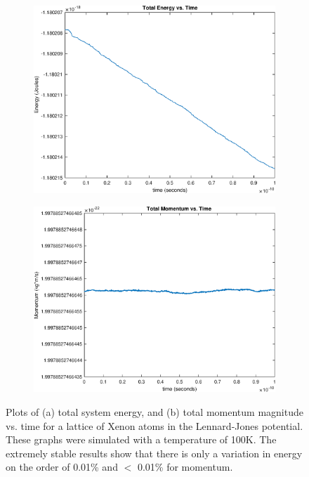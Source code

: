 \documentclass[12pt]{article}
\begin{document}
\begin{figure}[!h]
\begin{subfigure}{0.5\textwidth}
\includegraphics[width=0.9\linewidth]{./finalpics/LJEvsT.eps}
\caption{\label{LJEconservation}}
\end{subfigure}
\begin{subfigure}{0.5\textwidth}
\includegraphics[width=0.9\linewidth]{./finalpics/LJPvsT.eps}
\caption{\label{LJPconservation}}
\end{subfigure}
\caption{Plots of (a) total system energy, and (b) total momentum magnitude vs. time for a lattice of Xenon atoms in the Lennard-Jones potential.  These graphs were simulated with a temperature of 100K.  The extremely stable results show that there is only a variation in energy on the order of 0.01\% and $<$ 0.01\% for momentum.} 
\end{figure} 
\end{document}
